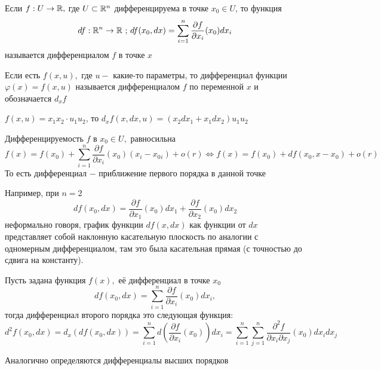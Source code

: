 \begin{definition}
	Если $f : U \to \mathbb{R},$ где $U \subset \mathbb{R}^n$ дифференцируема в точке $x_0 \in U$, то функция 
	\[ df : \mathbb{R}^n \to \mathbb{R}  \text{ ; }  df(x_0, dx) = \sum_{i = 1}^n\frac{\partial f}{\partial x_i}(x_0)dx_i \]
	называется дифференциалом $f$ в точке $x$
\end{definition}

\begin{remark}
	Если есть $f(x, u),$ где $u -$ какие-то параметры, то дифференциал функции $\varphi(x) = f(x, u)$ называется дифференциалом $f$ по переменной $x$ и обозначается $d_xf$
\end{remark}

\begin{exercise}
	$f(x, u) = x_1 x_2 \cdot u_1 u_2$, то $d_xf(x, dx, u) = (x_2dx_1 + x_1dx_2) u_1 u_2$
\end{exercise}

\begin{remark}
	Дифференцируемость $f$ в $x_0 \in U, $ равносильна
	\[ f(x) = f(x_0) + \sum_{i = 1}^n\frac{\partial f}{\partial x_i}(x_0)(x_i - x_0{_i}) + o(r) \Leftrightarrow f(x) = f(x_0) + df(x_0, x - x_0) + o(r) \]
	То есть дифференциал $-$ приближение первого порядка в данной точке
\end{remark}

\begin{exercise}
	Например, при $n = 2$
	\[ df(x_0, dx) = \frac{\partial f}{\partial x_1}(x_0)dx_1 + \frac{\partial f}{\partial x_2}(x_0)dx_2 \]
	неформально говоря, график функции $df(x, dx)$ как функции от $dx$ представляет собой наклонную касательную плоскость по аналогии с одномерным дифференциалом, там это была касательная прямая (с точностью до сдвига на константу).
\end{exercise}

\begin{definition}
	Пусть задана функция $f(x),$ её дифференциал в точке $x_0$
	\[ df(x_0, dx) = \sum_{i = 1}^n\frac{\partial f}{\partial x_i}(x_0)dx_i,\]
	 тогда дифференциал второго порядка это следующая функция:
	\[ d^2f(x_0, dx) = d_x(df(x_0, dx)) = \sum_{i = 1}^n d\left(\frac{\partial f}{\partial x_i}(x_0)\right)dx_i = \sum_{i = 1}^n \sum_{j = 1}^n \frac{\partial^2 f}{\partial x_i \partial x_j}(x_0)dx_idx_j \]
\end{definition}

\begin{remark}
	Аналогично определяются дифференциалы высших порядков
\end{remark}

